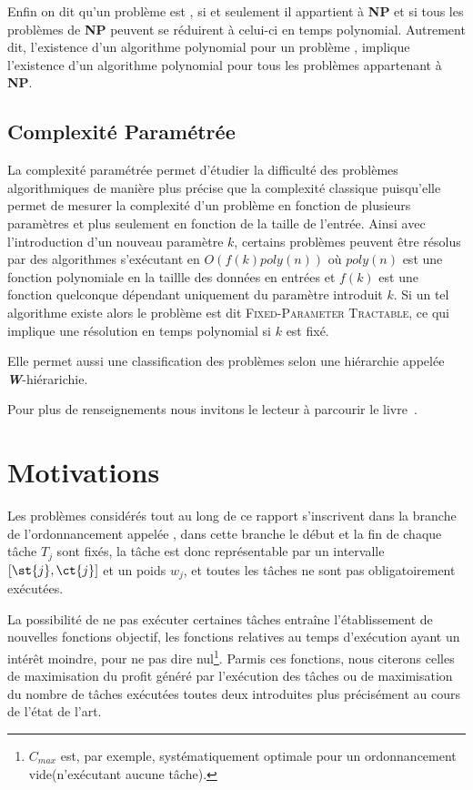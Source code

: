 \documentclass[a4paper,11pt]{report}
\begin{document}
Enfin on dit qu'un problème est \npc, si et seulement il appartient à \textbf{NP} et si
tous les problèmes de \textbf{NP} peuvent se réduirent à celui-ci en temps polynomial.
Autrement dit, l'existence d'un algorithme polynomial pour un problème \npc, implique l'existence
d'un algorithme polynomial pour tous les problèmes appartenant à \textbf{NP}.

\subsection{Complexité Paramétrée}

La complexité paramétrée permet d'étudier la difficulté des problèmes algorithmiques de manière plus
précise que la complexité classique puisqu'elle permet de mesurer la complexité d'un problème en
fonction de plusieurs paramètres et plus seulement en fonction de la taille de l'entrée. Ainsi avec
l'introduction d'un nouveau paramètre $k$, certains problèmes peuvent être résolus par des algorithmes
s'exécutant en $O\left( f(k) poly(n) \right)$ où $poly(n)$ est une fonction polynomiale en la
taillle des données en entrées et $f(k)$ est une fonction quelconque dépendant uniquement du
paramètre introduit $k$. Si un tel algorithme existe alors le problème est dit
\textsc{Fixed-Parameter Tractable}, ce qui implique une résolution en temps polynomial si $k$ est
fixé.

Elle permet aussi une classification des problèmes \npc selon une hiérarchie appelée
\textit{\textbf{W}}-hiérarichie.

Pour plus de renseignements nous invitons le lecteur à parcourir le
livre~\cite{flum2006parameterized}.

\section{Motivations}

Les problèmes considérés tout au long de ce rapport s'inscrivent dans la branche de l'ordonnancement
appelée \isched{}, dans cette branche le début et la fin de chaque tâche $T_j$ sont
fixés, la tâche est donc représentable par un intervalle $\left[ \st{j}, \ct{j} \right]$ et un poids
$w_j$, et toutes les tâches ne sont pas obligatoirement exécutées.

La possibilité de ne pas exécuter certaines tâches entraîne l'établissement de nouvelles fonctions
objectif, les fonctions relatives au temps d'exécution ayant un intérêt moindre, pour ne pas dire
nul\footnote{$C_{max}$ est, par exemple, systématiquement optimale pour un ordonnancement
vide(n'exécutant aucune tâche).}. Parmis ces fonctions, nous citerons celles de maximisation du
profit généré par l'exécution des tâches ou de maximisation du nombre de tâches exécutées toutes
deux introduites plus précisément au cours de l'état de l'art. 
\end{document}
